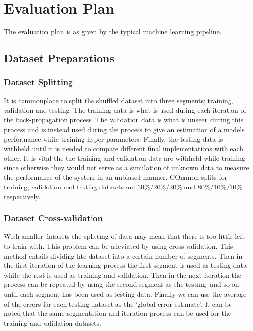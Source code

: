 \chapter{Evaluation Plan}

The evaluation plan is as given by the typical machine learning pipeline\cite{IntroToML}.

\section{Dataset Preparations}

\subsection{Dataset Splitting}

It is commonplace to split the shuffled dataset into  three segments; training, validation and testing. The training data is what is used during each iteration of the back-propagation process. The validation data is what is unseen during this process and is instead used during the process to give an estimation of a models performance while training hyper-parameters. Finally, the testing data is withheld until it is needed to compare different final implementations with each other. It is vital the the training and validation data are withheld while training since otherwise they would not serve as a simulation of unknown data to measure the performance of the system in an unbiased manner. COmmon splits for training, validation and testing datasets are 60\%/20\%/20\% and 80\%/10\%/10\%  respectively.

\subsection{Dataset Cross-validation}

With smaller datasets the splitting of data may mean that there is too little left to train with. This problem can be alleviated by using cross-validation. This method entails dividing hte dataset into a certain number of segments. Then in the first iteration of the learning process the first segment is used as testing data while the rest is used as training and validation. Then in the next iteration the process can be repeated by using the second segment as the testing, and so on until each segment has been used as testing data. Finally we can use the average of the errors for each testing dataset as the `global error estimate'. It can be noted that the same segmentation and iteration process can be used for the training and validation datasets.

